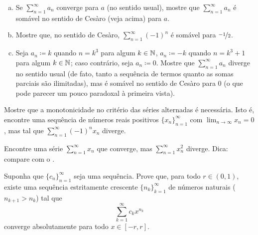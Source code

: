 \begin{exercise}[Desafiador]
\pagebreak[2]
\leavevmode
\begin{enumerate}[a)]
\item
Se $\sum_{n=1}^\infty a_n$ converge para $a$ (no sentido usual), mostre que
$\sum_{n=1}^\infty a_n$ é somável no sentido de Ces\`aro (veja acima) para $a$.
\item
Mostre que, no sentido de Ces\`aro, $\sum_{n=1}^\infty {(-1)}^n$ é somável para
$\nicefrac{-1}{2}$.
\item
Seja $a_n \coloneqq k$ quando $n = k^3$ para algum $k \in {\mathbb{N}}$,
$a_n \coloneqq -k$ quando $n = k^3+1$ para algum $k \in {\mathbb{N}}$;
caso contrário,
seja $a_n \coloneqq 0$. Mostre que $\sum_{n=1}^\infty a_n$ diverge no sentido usual
(de fato, tanto a sequência de termos quanto as somas parciais são ilimitadas), mas é
somável no sentido de Ces\`aro para 0 (o que pode parecer um pouco paradoxal à primeira vista).
\end{enumerate}
\end{exercise}

\begin{exercise}[Desafiador]
Mostre que a monotonicidade no critério das séries alternadas
é necessária. Isto é, encontre uma sequência de números reais positivos
$\{ x_n \}_{n=1}^\infty$ com $\lim_{n\to\infty} x_n = 0$, mas tal que
$\sum_{n=1}^\infty {(-1)}^n x_n$ diverge.
\end{exercise}

\begin{exercise}
Encontre uma série
$\sum_{n=1}^\infty x_n$ que converge,
mas $\sum_{n=1}^\infty x_n^2$ diverge.
Dica: compare com o .
\end{exercise}

\begin{exercise}
Suponha que $\{ c_n \}_{n=1}^\infty$ seja uma sequência. Prove que, para todo $r \in (0,1)$,
existe uma sequência estritamente crescente $\{ n_k \}_{k=1}^\infty$ de números naturais
($n_{k+1} > n_k$) tal que
\begin{equation*}
\sum_{k=1}^\infty c_k x^{n_k}
\end{equation*}
converge absolutamente para todo $x \in [-r,r]$.
\end{exercise}

